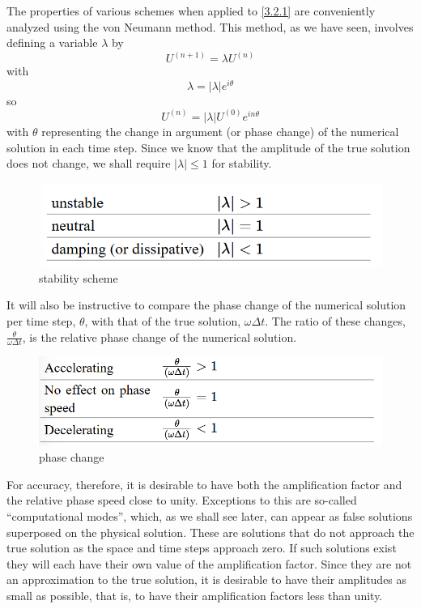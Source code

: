 The properties of various schemes when applied to \ref{3.2.1} are conveniently analyzed using the von Neumann method. This method, as we have seen, involves defining a variable $\lambda$ by
\begin{equation}\label{3.2.3}
    U^{(n+1)}=\lambda U^{(n)}
\end{equation}
with 
$$\lambda=|\lambda|e^{i\theta}$$
so 
\begin{equation}\label{3.2.5}
    U^{(n)}=|\lambda|U^{(0)}e^{in\theta}
\end{equation}
with $\theta$ representing the change in argument (or phase change) of the numerical solution in each time step. Since we know that the amplitude of the true solution does not change, we shall require $|\lambda|\leq 1$ for stability.
\begin{figure}[h]
    \centering
    \includegraphics[width=0.50\linewidth]{uploads/Screenshot 2024-11-11 225800.png}
    \caption{stability scheme}
    \label{fig:stab scheme}
\end{figure}
It will also be instructive to compare the phase change of the numerical solution per time step, $\theta$, with that of the true solution, $\omega\Delta t$. The ratio of these changes, $\frac{\theta}{\omega\Delta t}$, is the relative phase change of the numerical solution. 
\begin{figure}[h]
    \centering
    \includegraphics[width=0.50\linewidth]{uploads/Screenshot 2024-11-11 230012.png}
    \caption{phase change}
    \label{fig:phase change}
\end{figure}
For accuracy, therefore, it is desirable to have both the amplification factor and the relative phase speed close to unity. Exceptions to this are so-called “computational modes”, which, as we shall see later, can appear as false solutions superposed on the physical solution. These are solutions that do not approach the true solution as the space and time steps approach zero. If such solutions exist they will each have their own value of the amplification factor. Since they are not an approximation to the true solution, it is desirable to have their amplitudes as small as possible, that is, to have their amplification factors less than unity.\\


